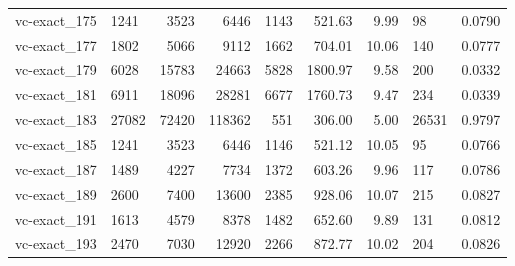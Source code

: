 \begin{longtable}{llrrrrrll}
vc-exact\_175 & 1241 & 3523 & 6446 & 1143 & 521.63 & 9.99 & 98 & 0.0790 \\
vc-exact\_177 & 1802 & 5066 & 9112 & 1662 & 704.01 & 10.06 & 140 & 0.0777 \\
vc-exact\_179 & 6028 & 15783 & 24663 & 5828 & 1800.97 & 9.58 & 200 & 0.0332 \\
vc-exact\_181 & 6911 & 18096 & 28281 & 6677 & 1760.73 & 9.47 & 234 & 0.0339 \\
vc-exact\_183 & 27082 & 72420 & 118362 & 551 & 306.00 & 5.00 & 26531 & 0.9797 \\
vc-exact\_185 & 1241 & 3523 & 6446 & 1146 & 521.12 & 10.05 & 95 & 0.0766 \\
vc-exact\_187 & 1489 & 4227 & 7734 & 1372 & 603.26 & 9.96 & 117 & 0.0786 \\
vc-exact\_189 & 2600 & 7400 & 13600 & 2385 & 928.06 & 10.07 & 215 & 0.0827 \\
vc-exact\_191 & 1613 & 4579 & 8378 & 1482 & 652.60 & 9.89 & 131 & 0.0812 \\
vc-exact\_193 & 2470 & 7030 & 12920 & 2266 & 872.77 & 10.02 & 204 & 0.0826 \\
\end{longtable}
